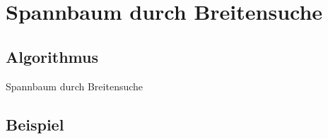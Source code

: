 \documentclass[18pt]{beamer}
\begin{document}
\section{Spannbaum durch Breitensuche}
\subsection{Algorithmus}
\begin{frame}{Spannbaum durch Breitensuche}
	
\end{frame}

\subsection{Beispiel}
\end{document}
